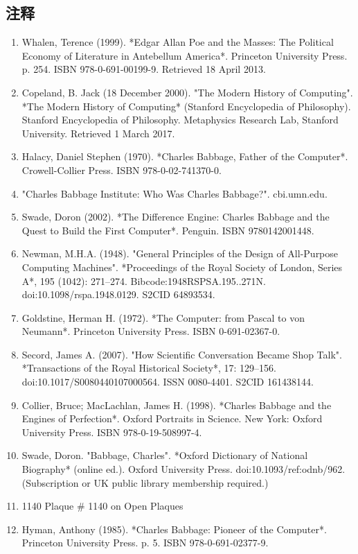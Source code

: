 \subsection{注释}
\begin{enumerate}
\item Whalen, Terence (1999). *Edgar Allan Poe and the Masses: The Political Economy of Literature in Antebellum America*. Princeton University Press. p. 254. ISBN 978-0-691-00199-9. Retrieved 18 April 2013.
\item Copeland, B. Jack (18 December 2000). "The Modern History of Computing". *The Modern History of Computing* (Stanford Encyclopedia of Philosophy). Stanford Encyclopedia of Philosophy. Metaphysics Research Lab, Stanford University. Retrieved 1 March 2017.
\item Halacy, Daniel Stephen (1970). *Charles Babbage, Father of the Computer*. Crowell-Collier Press. ISBN 978-0-02-741370-0.
\item "Charles Babbage Institute: Who Was Charles Babbage?". cbi.umn.edu.
\item Swade, Doron (2002). *The Difference Engine: Charles Babbage and the Quest to Build the First Computer*. Penguin. ISBN 9780142001448.
\item Newman, M.H.A. (1948). "General Principles of the Design of All-Purpose Computing Machines". *Proceedings of the Royal Society of London, Series A*, 195 (1042): 271–274. Bibcode:1948RSPSA.195..271N. doi:10.1098/rspa.1948.0129. S2CID 64893534.
\item Goldstine, Herman H. (1972). *The Computer: from Pascal to von Neumann*. Princeton University Press. ISBN 0-691-02367-0.
\item Secord, James A. (2007). "How Scientific Conversation Became Shop Talk". *Transactions of the Royal Historical Society*, 17: 129–156. doi:10.1017/S0080440107000564. ISSN 0080-4401. S2CID 161438144.
\item Collier, Bruce; MacLachlan, James H. (1998). *Charles Babbage and the Engines of Perfection*. Oxford Portraits in Science. New York: Oxford University Press. ISBN 978-0-19-508997-4.
\item Swade, Doron. "Babbage, Charles". *Oxford Dictionary of National Biography* (online ed.). Oxford University Press. doi:10.1093/ref:odnb/962. (Subscription or UK public library membership required.)
\item 1140 Plaque # 1140 on Open Plaques
\item Hyman, Anthony (1985). *Charles Babbage: Pioneer of the Computer*. Princeton University Press. p. 5. ISBN 978-0-691-02377-9.

\end{enumerate}
